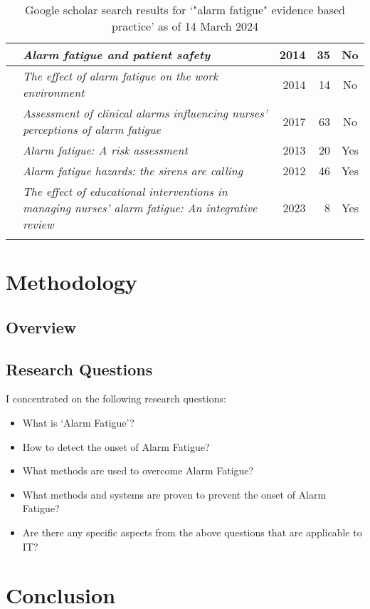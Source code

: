 \documentclass[]{report}
\begin{document}
\begin{longtable}{
			|>{\raggedright\arraybackslash}p{3.7cm}
			|>{\raggedright\arraybackslash}p{3.7cm}
			|r
			|r
			|c
			|}
        \hline 
		\citet{horkan2014alarm} & \textit{Alarm fatigue and patient safety} & 2014 & 35 & No \\
		\hline
		\citet{blake2014effect} & \textit{The effect of alarm fatigue on the work environment} & 2014 & 14 & No \\
		\hline
		\citet{petersen2017assessment} & \textit{Assessment of clinical alarms influencing nurses' perceptions of alarm fatigue} & 2017 & 63 & No \\
		\hline
		\citet{baillargeon2013alarm} & \textit{Alarm fatigue: A risk assessment} & 2013 & 20 & Yes \\
		\hline
		\citet{welch2012alarm} & \textit{Alarm fatigue hazards: the sirens are calling} & 2012 & 46 & Yes \\
		\hline
		\citet{nyarko2023effect} & \textit{The effect of educational interventions in managing nurses' alarm fatigue: An integrative review} & 2023 & 8 & Yes \\
		\hline
		
	    \caption{Google scholar search results for `"alarm fatigue" evidence based practice' as of 14 March 2024} 
	\end{longtable}

    \chapter{Methodology}
    
    \section{Overview}
    
    \section{Research Questions}
    
    I concentrated on the following research questions:
    
    \begin{itemize}
    	\item What is `Alarm Fatigue'?
    	\item How to detect the onset of Alarm Fatigue?
    	\item What methods are used to overcome Alarm Fatigue?
    	\item What methods and systems are proven to prevent the onset of Alarm Fatigue?
    	\item Are there any specific aspects from the above questions that are applicable to IT?
    \end{itemize}

	
	
	
	
	
	
	\chapter{Conclusion}
	
	
\end{document}
